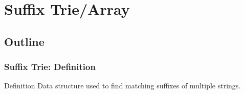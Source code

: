 \documentclass{beamer}
\begin{document}
\section{Suffix Trie/Array} %
\subsection{Outline}
\begin{frame}
  \frametitle{Suffix Trie: Definition}

  {\smaller
    \begin{block}{Definition}
      Data structure used to find matching suffixes of multiple strings.
    \end{block}
    
    \vfill

    \begin{center}
    \end{center}
    
    \vfill

}
\end{frame}
\end{document}
